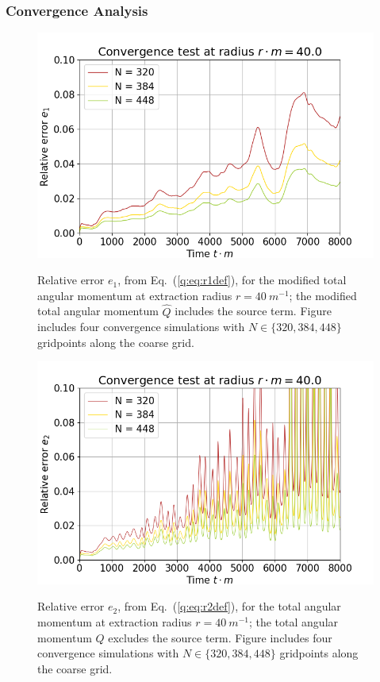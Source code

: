 \subsubsection{Convergence Analysis}\label{q:sect:conv}

\begin{figure}[h]
{\includegraphics[width=0.65\columnwidth]{png/paper_conv40_2.png}}
\caption{ Relative error $e_1$, from Eq.~(\ref{q:eq:r1def}), for the modified total angular momentum at extraction radius $r=40 ~m^{-1}$; the modified total angular momentum $\hat{Q}$ includes the source term. Figure includes four convergence simulations with $N\in\{320,384,448\}$ gridpoints along the coarse grid.}
\label{q:fig:r1}
\end{figure}
\begin{figure}[h]
{\includegraphics[width=0.65\columnwidth]{png/paper_conv40.png}}
\caption{ Relative error $e_2$, from Eq.~(\ref{q:eq:r2def}), for the total angular momentum at extraction radius $r=40 ~m^{-1}$; the total angular momentum ${Q}$ excludes the source term. Figure includes four convergence simulations with $N\in\{320,384,448\}$ gridpoints along the coarse grid.}
\label{q:fig:r2}
\end{figure}

